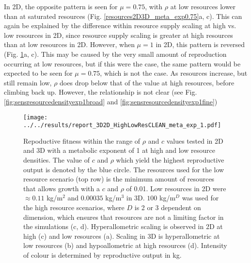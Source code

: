 \documentclass[a4paper, 11pt, hidelinks]{article} %
\begin{document}
	In 2D, the opposite pattern is seen for $ \mu = 0.75 $, with $ \rho $ at low resources lower than at saturated resources (Fig. \ref{resources2D3D_meta_exp0.75}a, c).  This can again be explained by the difference within resource supply scaling at high vs. low resources in 2D, since resource supply scaling is greater at high resources than at low resources in 2D.  However, when $ \mu = 1 $ in 2D, this pattern is reversed (Fig. \ref{resources2D3D_meta_exp1}a, c).  This may be caused by the very small amount of reproduction occurring at low resources, but if this were the case, the same pattern would be expected to be seen for $ \mu = 0.75 $, which is not the case.  As resources increase, but still remain low, $ \rho $ does drop below that of the value at high resources, before climbing back up.  However, the relationship is not clear (see Fig. \ref{fig:sensresourcedensityexp1broad} and \ref{fig:sensresourcedensityexp1fine})
	

	\begin{figure}[H]
		\centering
		\texttt{[image: ../../results/report\_3D2D\_HighLowResCLEAN\_meta\_exp\_1.pdf]}
		
		\caption{Repoductive fitness within the range of $ \rho $ and $ c $ values tested in 2D and 3D with a metabolic exponent of 1 at high and low resource densities. 
		The value of $ c $ and $ \rho $ which yield the highest reproductive output is denoted by the blue circle.
		The resources used for the low resource scenario (top row) is the minimum amount of resources that allows growth with a $c$ and $\rho$ of 0.01.  
		Low resources in 2D were $ \approx 0.11$ kg/m$^2 $ and $ 0.00035$ kg/m$^3 $ in 3D.
		$ 100$ kg/m$^D $ was used for the high resource scenarios, where $D$ is 2 or 3 dependent on dimension, which ensures that resources are not a limiting factor in the simulations (c, d).
		Hyperallometric scaling is observed in 2D at high (c) and low resources (a).
		Scaling in 3D is hyperallometric at low resources (b) and hypoallometric at high resources (d).
		Intensity of colour is determined by reproductive output in kg.}
		\label{resources2D3D_meta_exp1}
	\end{figure}
\end{document}
